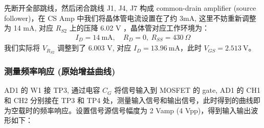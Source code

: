 \documentclass[UTF8]{article}
\begin{document}
先断开全部跳线，然后闭合跳线 J1, J4, J7 构成 common-drain amplifier (source follower)，在 CS Amp 中我们将晶体管电流设置在了约 3mA, 这里不妨重新调整为 14 mA, 对应 $R_{S2}$ 上的压降 6.02 V ，晶体管对应工作环境为：
\begin{gather}
I_D = 14 \ \mathrm{mA},\quad R_D = 0,\ R_{SS} = 430 \ \Omega
\end{gather}
我们实际将 $V_{R_{S2}}$ 调整到了 6.003 V, 对应 $I_D =  13.96 \ \mathrm{mA}$，此时 $V_{GS} = 2.513 \ \mathrm{V}$。

\subsubsection{测量频率响应 (原始增益曲线)}

AD1 的 W1 接 TP3, 通过电容 $C_G$ 将信号输入到 MOSFET 的 gate, AD1 的 CH1 和 CH2 分别接在 TP3 和 TP4 处，测量输入信号和输出信号，此时得到的曲线即为空载时的频率响应。设置信号源信号幅度为 2 Vamp (4 Vpp)，得到输入输出波形如下：
\end{document}
